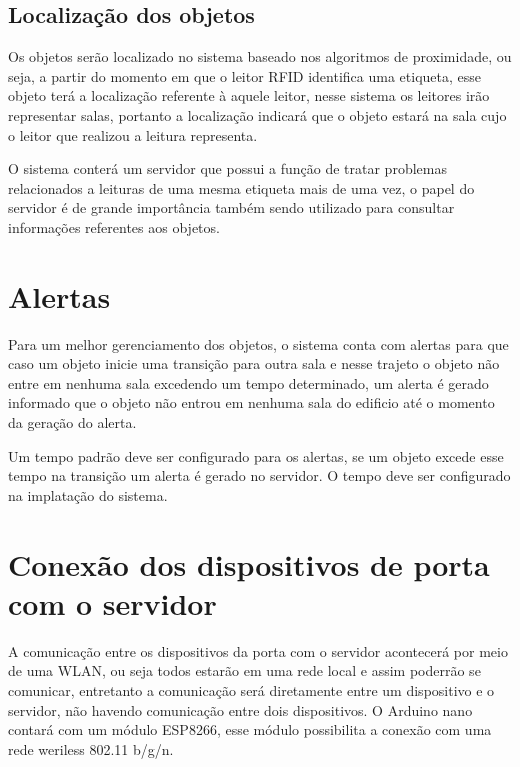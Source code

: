 \subsection{Localização dos objetos}
Os objetos serão localizado no sistema baseado nos algoritmos de proximidade, ou seja, a partir do momento em que o leitor RFID identifica uma etiqueta, esse objeto terá a localização referente à aquele leitor, nesse sistema os leitores irão representar salas, portanto a localização indicará que o objeto estará na sala cujo o leitor que realizou a leitura representa.
\par
O sistema conterá um servidor que possui a função de tratar problemas relacionados a leituras de uma mesma etiqueta mais de uma vez, o papel do servidor é de grande importância também sendo utilizado para consultar informações referentes aos objetos.

\section{Alertas}
Para um melhor gerenciamento dos objetos, o sistema conta com alertas para que caso um objeto inicie uma transição para outra sala e nesse trajeto o objeto não entre em nenhuma sala excedendo um tempo determinado, um alerta é gerado informado que o objeto não entrou em nenhuma sala do edificio até o momento da geração do alerta.
\par
Um tempo padrão deve ser configurado para os alertas, se um objeto excede esse tempo na transição um alerta é gerado no servidor. O tempo deve ser configurado na implatação do sistema.

\section{Conexão dos dispositivos de porta com o servidor}
A comunicação entre os dispositivos da porta com o servidor acontecerá por meio de uma WLAN, ou seja todos estarão em uma rede local e assim poderrão se comunicar, entretanto a comunicação será diretamente entre um dispositivo e o servidor, não havendo comunicação entre dois dispositivos. O Arduino nano contará com um módulo ESP8266, esse módulo possibilita a conexão com uma rede weriless 802.11 b/g/n.

